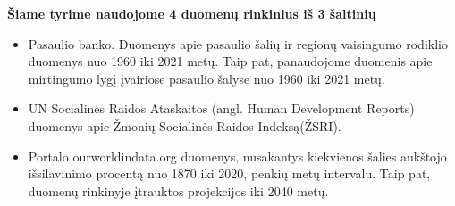 \textbf{Šiame tyrime naudojome 4 duomenų rinkinius iš 3 šaltinių}
\begin{itemize}
    \item Pasaulio banko. Duomenys apie pasaulio šalių ir regionų vaisingumo rodiklio duomenys nuo 1960 iki 2021 metų. Taip pat, panaudojome duomenis apie mirtingumo lygį įvairiose pasaulio šalyse nuo 1960 iki 2021 metų. 
    \item UN Socialinės Raidos Ataskaitos (angl. Human Development Reports) duomenys apie Žmonių Socialinės Raidos Indeksą(ŽSRI).
    \item Portalo ourworldindata.org duomenys, nusakantys kiekvienos šalies aukštojo išsilavinimo procentą nuo 1870 iki 2020, penkių metų intervalu. Taip pat, duomenų rinkinyje įtrauktos projekcijos iki 2040 metų.
\end{itemize}